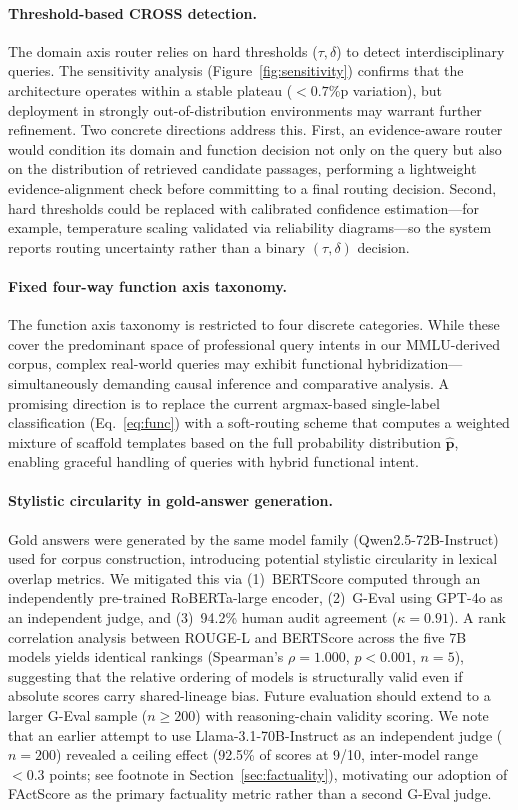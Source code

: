 \documentclass[a4paper,fleql]{cas-sc}
\begin{document}
\paragraph{Threshold-based CROSS detection.}
The domain axis router relies on hard thresholds ($\tau, \delta$) to detect
interdisciplinary queries. The sensitivity analysis (Figure~\ref{fig:sensitivity})
confirms that the architecture operates within a stable plateau ($< 0.7$\%p
variation), but deployment in strongly out-of-distribution environments may
warrant further refinement. Two concrete directions address this. First, an evidence-aware router would
condition its domain and function decision not only on the query but also on
the distribution of retrieved candidate passages, performing a lightweight
evidence-alignment check before committing to a final routing decision.
Second, hard thresholds could be replaced with calibrated confidence
estimation---for example, temperature scaling validated via reliability
diagrams---so the system reports routing uncertainty rather than a binary
$(\tau, \delta)$ decision.

\paragraph{Fixed four-way function axis taxonomy.}
The function axis taxonomy is restricted to four discrete categories.
While these cover the predominant space of professional query intents in
our MMLU-derived corpus, complex real-world queries may exhibit functional
hybridization---simultaneously demanding causal inference and comparative
analysis. A promising direction is to replace the current argmax-based
single-label classification (Eq.~\ref{eq:func}) with a soft-routing scheme
that computes a weighted mixture of scaffold templates based on the full
probability distribution $\hat{\mathbf{p}}$, enabling graceful handling of
queries with hybrid functional intent.

\paragraph{Stylistic circularity in gold-answer generation.}
Gold answers were generated by the same model family (Qwen2.5-72B-Instruct)
used for corpus construction, introducing potential stylistic circularity in
lexical overlap metrics. We mitigated this via (1)~BERTScore computed through
an independently pre-trained RoBERTa-large encoder, (2)~G-Eval using GPT-4o
as an independent judge, and (3)~94.2\% human audit agreement ($\kappa = 0.91$).
A rank correlation analysis between ROUGE-L and BERTScore across the five 7B
models yields identical rankings (Spearman's $\rho = 1.000$, $p < 0.001$,
$n = 5$), suggesting that the relative ordering of models is structurally
valid even if absolute scores carry shared-lineage bias. Future evaluation
should extend to a larger G-Eval sample ($n{\geq}200$) with reasoning-chain
validity scoring.
We note that an earlier attempt to use Llama-3.1-70B-Instruct as an
independent judge ($n{=}200$) revealed a ceiling effect (92.5\% of scores at 9/10,
inter-model range ${<}0.3$ points; see footnote in Section~\ref{sec:factuality}),
motivating our adoption of FActScore as the primary factuality metric rather than
a second G-Eval judge.
\end{document}

